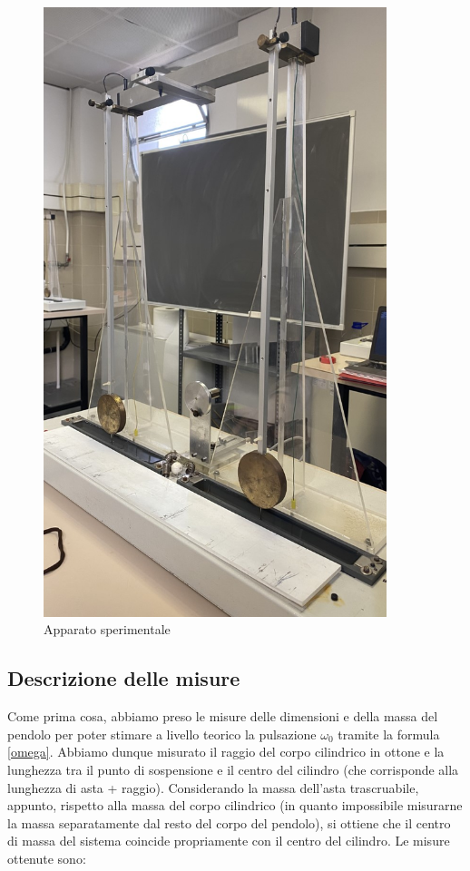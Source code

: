 \documentclass{article}
\begin{document}
\begin{figure} [H]
    \centering
    \includegraphics[width=10cm]{coppia.jpg}
    \caption{Apparato sperimentale}
    \label{fig:my_label}
\end{figure}

\FloatBarrier

\vspace{1em}

\subsection{Descrizione delle misure}
Come prima cosa, abbiamo preso le misure delle dimensioni e della massa del pendolo per poter stimare a livello teorico la pulsazione $\omega_0$ tramite la formula \eqref{omega}. Abbiamo dunque misurato il raggio del corpo cilindrico in ottone e la lunghezza tra il punto di sospensione e il centro del cilindro (che corrisponde alla lunghezza di asta + raggio). Considerando la massa dell'asta trascruabile, appunto, rispetto alla massa del corpo cilindrico (in quanto impossibile misurarne la massa separatamente dal resto del corpo del pendolo), si ottiene che il centro di massa del sistema coincide propriamente con il centro del cilindro. Le misure ottenute sono:
\end{document}
